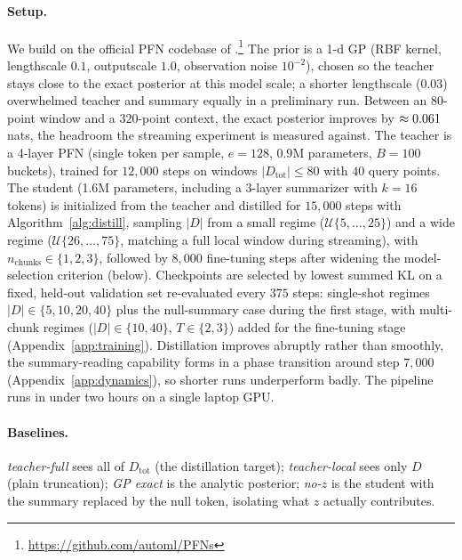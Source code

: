 \documentclass[11pt]{article}
\newcommand{\Dtot}{D_{\mathrm{tot}}}
\newcommand{\Dloc}{D}
\begin{document}
\paragraph{Setup.} We build on the official PFN codebase of
\citet{muller2022pfn}.\footnote{\url{https://github.com/automl/PFNs}} The
prior is a 1-d GP (RBF kernel, lengthscale $0.1$, outputscale $1.0$,
observation noise $10^{-2}$), chosen so the teacher stays close to the
exact posterior at this model scale; a shorter lengthscale ($0.03$)
overwhelmed teacher and summary equally in a preliminary run. Between an
$80$-point window and a $320$-point context, the exact posterior improves
by $\approx0.061{}$ nats, the headroom the streaming experiment
is measured against. The teacher is a 4-layer PFN (single token per
sample, $e=128$, $0.9$M parameters, $B=100$ buckets), trained for
$12{,}000$ steps on windows $|\Dtot| \le 80$ with $40$ query points. The
student (1.6M parameters, including a 3-layer summarizer with $k=16$
tokens) is initialized from the teacher and distilled for $15{,}000$ steps
with Algorithm~\ref{alg:distill}, sampling $|\Dloc|$ from a small regime
($\mathcal{U}\{5,\dots,25\}$) and a wide regime
($\mathcal{U}\{26,\dots,75\}$, matching a full local window during
streaming), with $n_{\mathrm{chunks}} \in \{1,2,3\}$, followed by
$8{,}000$ fine-tuning steps after widening the model-selection criterion
(below). Checkpoints are selected by lowest summed KL on a fixed, held-out
validation set re-evaluated every $375$ steps: single-shot regimes
$|\Dloc| \in \{5,10,20,40\}$ plus the null-summary case during the first
stage, with multi-chunk regimes ($|\Dloc| \in \{10,40\}$,
$T \in \{2,3\}$) added for the fine-tuning stage
(Appendix~\ref{app:training}). Distillation improves abruptly
rather than smoothly, the summary-reading capability forms in a phase
transition around step $7{,}000$ (Appendix~\ref{app:dynamics}), so
shorter runs underperform badly. The pipeline runs in under two hours on a
single laptop GPU.

\paragraph{Baselines.} \emph{teacher-full} sees all of $\Dtot$ (the
distillation target); \emph{teacher-local} sees only $\Dloc$ (plain
truncation); \emph{GP exact} is the analytic posterior; \emph{no-$z$} is
the student with the summary replaced by the null token, isolating what
$z$ actually contributes.
\end{document}

